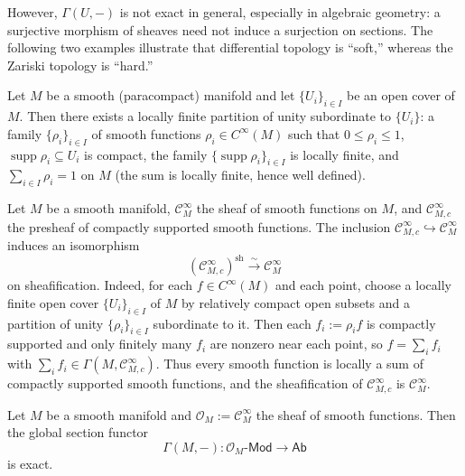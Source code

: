 \documentclass[11pt]{article}
\newcommand{\sh}{\operatorname{sh}}
\begin{document}
However, $ \Gamma(U,-) $ is not exact in general, especially in algebraic geometry:
a surjective morphism of sheaves need not induce a surjection on sections. 
The following two examples illustrate that differential topology is ``soft,'' 
whereas the Zariski topology is ``hard.'' 

\begin{lemma}
  \label{lemma: partition of units}
  Let $ M $ be a smooth (paracompact) manifold and let $ \{U_{i}\}_{i \in I} $ be an open cover of $ M $. 
  Then there exists a locally finite partition of unity subordinate to $ \{U_{i}\} $: 
  a family $ \{\rho_{i}\}_{i \in I} $ of smooth functions $ \rho_{i} \in C^{\infty}(M) $ such that 
  $ 0 \le \rho_{i} \le 1 $, $ \operatorname{supp}\rho_{i} \subseteq U_{i} $ is compact, 
  the family $ \{\operatorname{supp}\rho_{i}\}_{i \in I} $ is locally finite, and 
  $ \sum_{i \in I} \rho_{i} = 1 $ on $ M $ (the sum is locally finite, hence well defined).
\end{lemma}

\begin{example}
  Let $ M $ be a smooth manifold, $ \mathscr{C}^{\infty}_{M} $ the sheaf of smooth functions on $ M $, 
  and $ \mathscr{C}^{\infty}_{M,c} $ the presheaf of compactly supported smooth functions. 
  The inclusion $ \mathscr{C}^{\infty}_{M,c} \hookrightarrow \mathscr{C}^{\infty}_{M} $ induces an isomorphism 
  $$ (\mathscr{C}^{\infty}_{M,c})^{\sh} \xrightarrow{\sim} \mathscr{C}^{\infty}_{M} $$
  on sheafification. Indeed, for each $ f \in C^{\infty}(M) $ and each point, choose a locally finite open cover 
  $ \{U_{i}\}_{i \in I} $ of $ M $ by relatively compact open subsets and a partition of unity 
  $ \{\rho_{i}\}_{i \in I} $ subordinate to it. Then each $ f_{i} := \rho_{i} f $ is compactly supported 
  and only finitely many $ f_{i} $ are nonzero near each point, so $ f = \sum_{i} f_{i} $ 
  with $ \sum_{i} f_{i} \in \Gamma(M,\mathscr{C}^{\infty}_{M,c}) $. 
  Thus every smooth function is locally a sum of compactly supported smooth functions, 
  and the sheafification of $ \mathscr{C}^{\infty}_{M,c} $ is $ \mathscr{C}^{\infty}_{M} $.
\end{example}

\begin{proposition}
  Let $ M $ be a smooth manifold and $ \mathscr{O}_{M} := \mathscr{C}^{\infty}_{M} $ the sheaf of smooth functions. 
  Then the global section functor 
  $$ \Gamma(M,-) : \mathscr{O}_{M}\text{-}\mathsf{Mod} \longrightarrow \mathsf{Ab} $$
  is exact.
\end{proposition}
\end{document}
